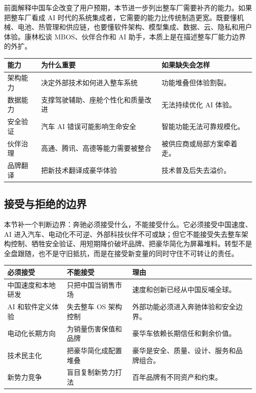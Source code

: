 \documentclass[a4paper]{article}
\begin{document}
前面解释中国车企改变了用户预期，本节进一步列出整车厂需要补齐的能力。如果把整车厂看成 AI 时代的系统集成者，它需要的能力比传统制造更宽。既要懂机械、电池、热管理和供应链，也要懂软件架构、模型集成、数据、云、隐私和用户体验。康林松谈 MBOS、伙伴合作和 AI 助手，本质上是在描述整车厂能力边界的外扩。

\noindent\begin{tabularx}{\textwidth}{p{}p{}X}
\toprule
能力 & 为什么重要 & 如果缺失会怎样 \\
\midrule
架构能力 & 决定外部技术如何进入整车系统 & 功能堆叠但体验割裂。 \\
数据能力 & 支撑驾驶辅助、座舱个性化和质量改进 & 无法持续优化 AI 体验。 \\
安全验证 & 汽车 AI 错误可能影响生命安全 & 智能功能无法可靠规模化。 \\
伙伴治理 & 高通、腾讯、高德等能力需要被整合 & 被供应商或局部方案牵着走。 \\
品牌翻译 & 把新技术翻译成豪华体验 & 技术普及后失去溢价。 \\
\bottomrule
\end{tabularx}

\subsection{接受与拒绝的边界}

本节补一个判断边界：奔驰必须接受什么，不能接受什么。它必须接受中国速度、AI 进入汽车、电动化不可逆、外部科技伙伴不可或缺；但它不能接受失去整车架构控制、牺牲安全验证、用短期降价破坏品牌、把豪华简化为屏幕堆料。转型不是全盘跟随，也不是守旧抵抗，而是在接受新变量的同时守住不可转让的责任。

\noindent\begin{tabularx}{\textwidth}{p{}p{}X}
\toprule
必须接受 & 不能接受 & 理由 \\
\midrule
中国速度和本地研发 & 只把中国当销售市场 & 速度和创新已经从中国反哺全球。 \\
AI 和软件定义体验 & 失去整车 OS 架构控制 & 外部功能必须进入奔驰体验和安全边界。 \\
电动化长期方向 & 为销量伤害保值和品牌 & 豪华车依赖长期信任和剩余价值。 \\
技术民主化 & 把豪华简化成配置堆叠 & 豪华是安全、质量、设计、服务和品牌组合。 \\
新势力竞争 & 盲目复制新势力打法 & 百年品牌有不同资产和约束。 \\
\bottomrule
\end{tabularx}
\end{document}
